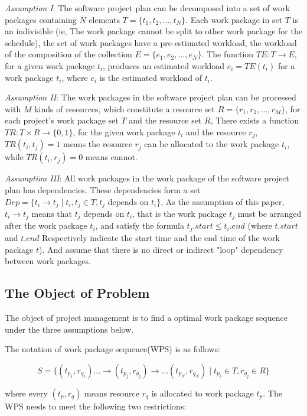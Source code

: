 \emph{Assumption I}: The software project plan can be decomposed into
a set of work packages containing $N$ elements $T = \{t_1, t_2, ...,
t_N \}$.  Each work package in set $T$ is an indivisible (ie, The work
package cannot be split to other work package for the schedule), the
set of work packages have a pre-estimated workload, the workload of
the composition of the collection $E = \{e_1, e_2, ..., e_N \}$.  The
function $TE: T \rightarrow E$, for a given work package $t_i$,
produces an estimated workload $e_i = TE(t_i)$ for a work package
$t_i$, where $e_i$ is the estimated workload of $t_i$.


\emph{Assumption II}: The work packages in the software project plan
can be processed with $M$ kinds of resources, which constitute a
resource set $R = \{r_1, r_2, ..., r_M \}$, for each project's work
package set $T$ and the resource set $R$, There exists a function
$TR: T \times R \rightarrow \{0, 1\}$, for the given work package $t_i$
and the resource $r_j$, $TR(t_i, t_j) = 1$ means the resource $r_j$ can
be allocated to the work package $t_i$, while $TR (t_i, r_j) = 0$ means
cannot.


\emph{Assumption III}: All work packages in the work package of the
software project plan has dependencies.  These dependencies form a set
$Dep= \{t_i \rightarrow t_j \mid t_i, t_j \in T, t_j \text{ depends on } t_i\}$.
As the assumption of this paper, $t_i \rightarrow t_j$ means that
$t_j$ depends on $t_i$, that is the work package $t_j$ must be
arranged after the work package $t_i$, and satisfy the formula
$t_j.start \leq t_i.end$ (where $t.start$ and $t.end$ Respectively
indicate the start time and the end time of the work package $t$).
And assume that there is no direct or indirect "loop" dependency
between work packages.


\subsection{The Object of Problem}
%
The object of project management is to find a optimal work package sequence
under the three assumptions below.

The notation of work package sequence(WPS) is as follows:

\begin{equation}
  S = \{
  (t_{p_1}, r_{q_1}) ... \rightarrow (t_{p_j}, r_{q_j}) \rightarrow ... (t_{p_N}, r_{q_N})
  \mid t_{p_i} \in T, r_{q_j} \in R
  \}
\end{equation}

where every $(t_p, r_q)$ means resource $r_q$ is allocated to work package $t_p$.
The WPS needs to meet the following two restrictions:

